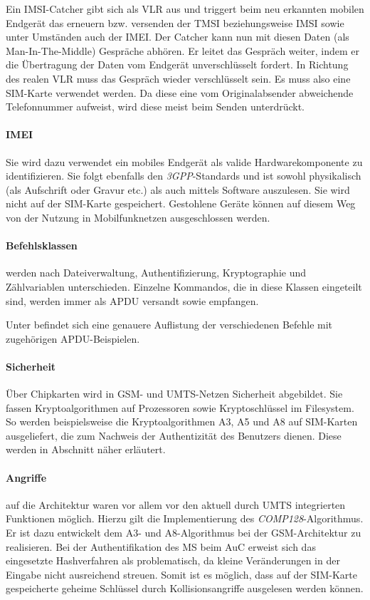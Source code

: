 Ein IMSI-Catcher gibt sich als \ac{VLR} aus und triggert beim neu
erkannten mobilen Endgerät das erneuern bzw. versenden der \ac{TMSI}
beziehungsweise \ac{IMSI} sowie unter Umständen auch der \ac{IMEI}. Der Catcher
kann nun mit diesen Daten (als Man-In-The-Middle) Gespräche abhören.
Er leitet das Gespräch weiter, indem er die Übertragung der Daten
vom Endgerät unverschlüsselt fordert. In Richtung des realen \ac{VLR}
muss das Gespräch wieder verschlüsselt sein. Es muss also eine SIM-Karte
verwendet werden. Da diese eine vom Originalabsender abweichende
Telefonnummer aufweist, wird diese meist beim Senden unterdrückt.

\paragraph{IMEI} Sie wird dazu verwendet ein mobiles Endgerät als
valide Hardwarekomponente zu identifizieren. Sie folgt ebenfalls
den \textit{3GPP}-Standards und ist sowohl physikalisch (als
Aufschrift oder Gravur etc.) als auch mittels Software auszulesen.
Sie wird nicht auf der SIM-Karte gespeichert. %
Gestohlene Geräte können auf diesem Weg von der Nutzung in
Mobilfunknetzen ausgeschlossen werden. 

\paragraph{Befehlsklassen} werden nach Dateiverwaltung, Authentifizierung, Kryptographie
und Zählvariablen unterschieden\cite{spitz11}. Einzelne Kommandos, die in diese
Klassen eingeteilt sind, werden immer als \ac{APDU} versandt sowie empfangen.

Unter  befindet sich eine genauere
Auflistung der verschiedenen Befehle mit zugehörigen \ac{APDU}-Beispielen.

\paragraph{Sicherheit}
Über Chipkarten wird in \ac{GSM}- und \ac{UMTS}-Netzen Sicherheit abgebildet.
Sie fassen Kryptoalgorithmen auf Prozessoren sowie Kryptoschlüssel im
Filesystem. So werden beispielsweise die Kryptoalgorithmen A3, A5 und A8
auf SIM-Karten ausgeliefert, die zum Nachweis der Authentizität des Benutzers dienen.
Diese werden in Abschnitt 
näher erläutert.

\paragraph{Angriffe} auf die Architektur waren vor allem vor den aktuell durch UMTS
integrierten Funktionen möglich. Hierzu gilt die Implementierung des \textit{COMP128}-Algorithmus.
Er ist dazu entwickelt dem A3- und A8-Algorithmus bei der GSM-Architektur zu realisieren.
Bei der Authentifikation des \ac{MS} beim \ac{AuC} erweist sich das eingesetzte Hashverfahren
als problematisch, da kleine Veränderungen in der Eingabe nicht ausreichend streuen. Somit
ist es möglich, dass auf der SIM-Karte gespeicherte geheime Schlüssel durch Kollisionsangriffe
ausgelesen werden können.

